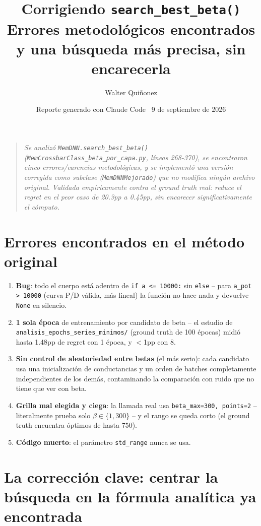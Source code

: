 \documentclass[11pt]{article}
\title{\textbf{Corrigiendo \texttt{search\_best\_beta()}}\\
\large Errores metodológicos encontrados y una búsqueda más precisa, sin encarecerla}
\author{Walter Quiñonez}
\date{Reporte generado con Claude Code \textperiodcentered\ 9 de septiembre de 2026}
\begin{document}
\maketitle

\begin{quote}\itshape
Se analizó \texttt{MemDNN.search\_best\_beta()} (\texttt{MemCrossbarClass\_beta\_por\_capa.py},
líneas 268-370), se encontraron cinco errores/carencias metodológicas, y se implementó una
versión corregida como subclase (\texttt{MemDNNMejorado}) que no modifica ningún archivo
original. Validada empíricamente contra el ground truth real: reduce el regret en el peor
caso de 20.3pp a 0.45pp, sin encarecer significativamente el cómputo.
\end{quote}

\tableofcontents

\section{Errores encontrados en el método original}

\begin{enumerate}
\item \textbf{Bug}: todo el cuerpo está adentro de \texttt{if a <= 10000:} sin \texttt{else}
-- para \texttt{a\_pot > 10000} (curva P/D válida, más lineal) la función no hace nada y
devuelve \texttt{None} en silencio.
\item \textbf{1 sola época} de entrenamiento por candidato de beta -- el estudio de
\texttt{analisis\_epochs\_series\_minimos/} (ground truth de 100 épocas) midió hasta 1.48pp
de regret con 1 época, y $<$1pp con 8.
\item \textbf{Sin control de aleatoriedad entre betas} (el más serio): cada candidato usa una
inicialización de conductancias y un orden de batches completamente independientes de los
demás, contaminando la comparación con ruido que no tiene que ver con beta.
\item \textbf{Grilla mal elegida y ciega}: la llamada real usa \texttt{beta\_max=300, points=2}
-- literalmente prueba solo $\beta\in\{1,300\}$ -- y el rango se queda corto (el ground truth
encuentra óptimos de hasta 750).
\item \textbf{Código muerto}: el parámetro \texttt{std\_range} nunca se usa.
\end{enumerate}

\section{La corrección clave: centrar la búsqueda en la fórmula analítica ya encontrada}
\end{document}

